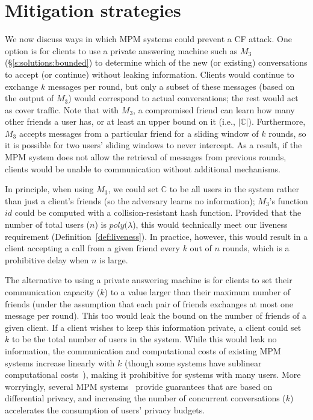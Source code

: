 \section{Mitigation strategies}\label{s:defense}

We now discuss ways in which MPM systems could prevent a CF attack.
One option is for clients to use a private answering machine such as $M_3$ 
  (\S\ref{s:solutions:bounded}) to determine which of the new (or existing) 
  conversations to accept (or continue) without leaking information.
Clients would continue to exchange $k$ messages per round, but only a subset 
  of these messages (based on the output of $M_3$) would correspond to 
  actual conversations; the rest would act as cover traffic.
Note that with $M_3$, a compromised friend can learn how many other
  friends a user has, or at least an upper bound on it (i.e., $|\mathbb{C}|$).
Furthermore, $M_3$ accepts messages from a particular friend for a
  sliding window of $k$ rounds, so it is possible for two users' sliding windows 
  to never intercept.
As a result, if the MPM system does not allow the retrieval of messages
  from previous rounds, clients would be unable to communication without
  additional mechanisms.

In principle, when using $M_3$, we could set $\mathbb{C}$ to be all users in 
  the system rather than just a client's friends (so the adversary learns no 
  information); $M_3$'s function $id$ could be computed with a 
  collision-resistant hash function.
Provided that the number of total users ($n$) is $poly(\lambda$), this would 
  technically meet our liveness requirement (Definition~\ref{def:liveness}). 
In practice, however, this would result in a client accepting a call from a 
  given friend every $k$ out of $n$ rounds, which is a prohibitive delay 
  when $n$ is large.

The alternative to using a private answering machine is for clients to 
  set their communication capacity ($k$) to a value larger than their 
  maximum number of friends (under the assumption that each pair of friends 
  exchanges at most one message per round).
This too would leak the bound on the number of friends of a given client.
If a client wishes to keep this information private, a client could set $k$ to 
  be the total number of users in the system.
While this would leak no information, the communication and computational 
  costs of existing MPM systems increase linearly with $k$ (though some 
  systems have sublinear computational costs~\cite{angel16unobservable}), 
  making it prohibitive for systems with many users.
More worryingly, several MPM systems~\cite{tyagi17stadium, vandenhoof15vuvuzela} 
  provide guarantees that are based on differential privacy, and increasing
  the number of concurrent conversations ($k$) accelerates the consumption of 
  users' privacy budgets.
